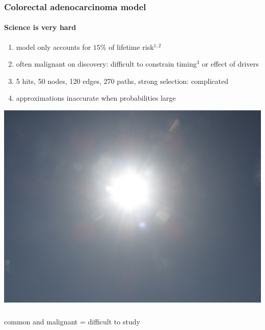 \documentclass{beamer}
\begin{document}
\begin{frame}
    \frametitle{Colorectal adenocarcinoma model}
    \framesubtitle{Science is very hard}
    \begin{enumerate}
        \item model only accounts for $15\%$ of lifetime risk${}^{1,2}$
        \item often malignant on discovery: difficult to constrain
        timing${}^3$ or effect of drivers 
        \item 5 hits, 50 nodes, 120 edges, 270 paths, strong selection: complicated
        \item approximations inaccurate when probabilities large
    \end{enumerate}


\end{frame}
{
{
    \includegraphics[width=\paperwidth]{figures/1280px-Sun_(Earth_POV).jpg}
}
\begin{frame}
    \frametitle{}
    \begin{center}
        common and malignant = difficult to study
    \end{center}

\end{frame}
}
\end{document}
